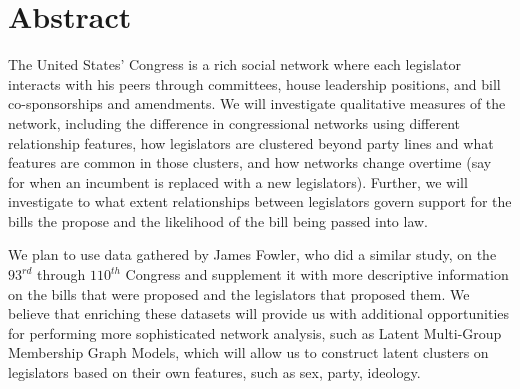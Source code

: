 \section{Abstract}

The United States' Congress is a rich social network where each legislator 
interacts with his peers through committees, house leadership positions, and 
bill co-sponsorships and amendments. We will investigate qualitative measures 
of the network, including the difference in congressional networks using 
different relationship features, how legislators are clustered beyond party 
lines and what features are common in those clusters, and how networks change 
overtime (say for when an incumbent is replaced with a new legislators). 
Further, we will investigate to what extent relationships between legislators 
govern support for the bills the propose and the likelihood of the bill being 
passed into law.

We plan to use data gathered by James Fowler, who did a similar study, on the 
$93^{rd}$ through $110^{th}$ Congress and supplement it with more descriptive 
information on the bills that were proposed and the legislators that proposed 
them. We believe that enriching these datasets will provide us with additional 
opportunities for performing more sophisticated network analysis, such as 
Latent Multi-Group Membership Graph Models, which will allow us to construct 
latent clusters on legislators based on their own features, such as sex, 
party, ideology.
